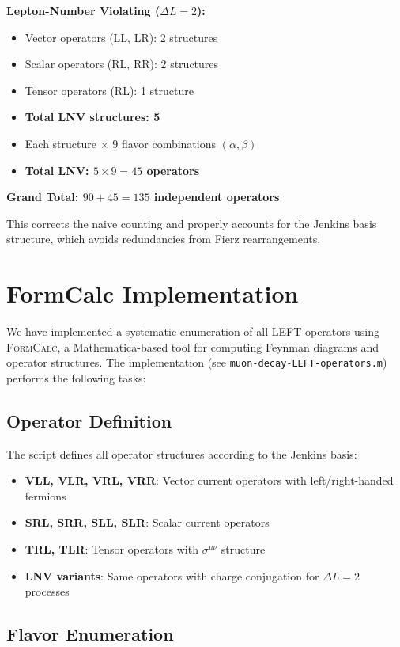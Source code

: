 \documentclass[11pt,a4paper]{article}
\newcommand{\formcalc}{\textsc{FormCalc}}
\begin{document}
\textbf{Lepton-Number Violating ($\Delta L = 2$):}
\begin{itemize}
\item Vector operators (LL, LR): 2 structures
\item Scalar operators (RL, RR): 2 structures
\item Tensor operators (RL): 1 structure
\item \textbf{Total LNV structures: 5}
\item Each structure $\times$ 9 flavor combinations $(\alpha,\beta)$
\item \textbf{Total LNV: $5 \times 9 = 45$ operators}
\end{itemize}

\textbf{Grand Total: $90 + 45 = 135$ independent operators}

This corrects the naive counting and properly accounts for the Jenkins basis structure, which avoids redundancies from Fierz rearrangements.

\section{FormCalc Implementation}

We have implemented a systematic enumeration of all LEFT operators using \formcalc{}, a Mathematica-based tool for computing Feynman diagrams and operator structures. The implementation (see \texttt{muon-decay-LEFT-operators.m}) performs the following tasks:

\subsection{Operator Definition}

The script defines all operator structures according to the Jenkins basis:
\begin{itemize}
\item \textbf{VLL, VLR, VRL, VRR}: Vector current operators with left/right-handed fermions
\item \textbf{SRL, SRR, SLL, SLR}: Scalar current operators
\item \textbf{TRL, TLR}: Tensor operators with $\sigma^{\mu\nu}$ structure
\item \textbf{LNV variants}: Same operators with charge conjugation for $\Delta L = 2$ processes
\end{itemize}

\subsection{Flavor Enumeration}
\end{document}
